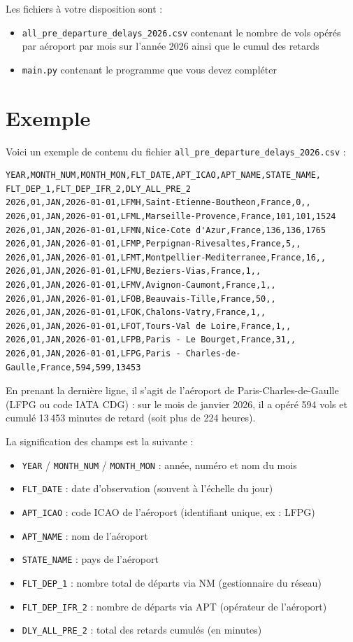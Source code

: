 \documentclass[12pt, a4paper]{exam}
\begin{document}
Les fichiers à votre disposition sont :

\begin{itemize}
  \item \texttt{all\_pre\_departure\_delays\_2026.csv} contenant le nombre de vols opérés par aéroport par mois sur l'année 2026 ainsi que le cumul des retards
  \item \texttt{main.py} contenant le programme que vous devez compléter
\end{itemize}

\newpage
\section{Exemple}

Voici un exemple de contenu du fichier
\texttt{all\_pre\_departure\_delays\_2026.csv} :

\begin{verbatim}
YEAR,MONTH_NUM,MONTH_MON,FLT_DATE,APT_ICAO,APT_NAME,STATE_NAME,
FLT_DEP_1,FLT_DEP_IFR_2,DLY_ALL_PRE_2
2026,01,JAN,2026-01-01,LFMH,Saint-Etienne-Boutheon,France,0,,
2026,01,JAN,2026-01-01,LFML,Marseille-Provence,France,101,101,1524
2026,01,JAN,2026-01-01,LFMN,Nice-Cote d'Azur,France,136,136,1765
2026,01,JAN,2026-01-01,LFMP,Perpignan-Rivesaltes,France,5,,
2026,01,JAN,2026-01-01,LFMT,Montpellier-Mediterranee,France,16,,
2026,01,JAN,2026-01-01,LFMU,Beziers-Vias,France,1,,
2026,01,JAN,2026-01-01,LFMV,Avignon-Caumont,France,1,,
2026,01,JAN,2026-01-01,LFOB,Beauvais-Tille,France,50,,
2026,01,JAN,2026-01-01,LFOK,Chalons-Vatry,France,1,,
2026,01,JAN,2026-01-01,LFOT,Tours-Val de Loire,France,1,,
2026,01,JAN,2026-01-01,LFPB,Paris - Le Bourget,France,31,,
2026,01,JAN,2026-01-01,LFPG,Paris - Charles-de-Gaulle,France,594,599,13453
\end{verbatim}

En prenant la dernière ligne, il s'agit de l'aéroport de
Paris-Charles-de-Gaulle (LFPG ou code IATA CDG) : sur le mois de janvier 2026,
il a opéré 594 vols et cumulé 13\,453 minutes de retard (soit plus de 224
heures).

La signification des champs est la suivante :

\begin{itemize}
  \item \texttt{YEAR} / \texttt{MONTH\_NUM} / \texttt{MONTH\_MON} : année, numéro et nom du mois
  \item \texttt{FLT\_DATE} : date d'observation (souvent à l'échelle du jour)
  \item \texttt{APT\_ICAO} : code ICAO de l'aéroport (identifiant unique, ex : LFPG)
  \item \texttt{APT\_NAME} : nom de l'aéroport
  \item \texttt{STATE\_NAME} : pays de l'aéroport
  \item \texttt{FLT\_DEP\_1} : nombre total de départs via NM (gestionnaire du réseau)
  \item \texttt{FLT\_DEP\_IFR\_2} : nombre de départs via APT (opérateur de l'aéroport)
  \item \texttt{DLY\_ALL\_PRE\_2} : total des retards cumulés (en minutes)
\end{itemize}
\end{document}
